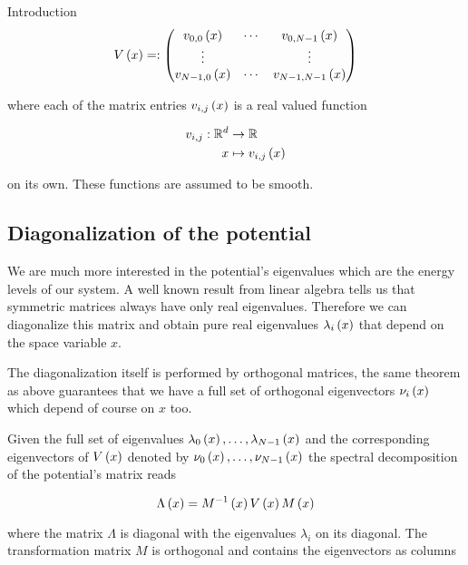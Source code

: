 \begin{chapter}{Introduction}
\begin{equation} \label{eq:general_potential_matrix}
  V\left( x \right) =:
  \begin{pmatrix}
    v_{0,0}\left( x \right) & \cdots & v_{0,N-1}\left( x \right) \\
    \vdots         &        & \vdots \\
    v_{N-1,0}\left( x \right) & \cdots & v_{N-1,N-1}\left( x \right)
  \end{pmatrix}
\end{equation}

where each of the matrix entries $v_{i,j}\left( x \right)$ is a real valued function

\begin{align*} \label{eq:matrix_potential_function_entry}
  v_{i,j} : \mathbb{R}^d & \rightarrow \mathbb{R} \\
                       x & \mapsto v_{i,j}\left( x \right)
\end{align*}

on its own. These functions are assumed to be smooth.

\subsection{Diagonalization of the potential}
\label{sec:diagonalize_potential}

We are much more interested in the potential's eigenvalues which are the energy
levels of our system. A well known result from linear algebra tells us that
symmetric matrices always have only real eigenvalues. Therefore we can diagonalize
this matrix and obtain pure real eigenvalues $\lambda_i\left( x \right)$ that depend on the
space variable $x$.

The diagonalization itself is performed by orthogonal matrices, the same theorem
as above guarantees that we have a full set of orthogonal eigenvectors $\nu_i\left( x \right)$
which depend of course on $x$ too.

Given the full set of eigenvalues $\lambda_0\left( x \right), \ldots, \lambda_{N-1}\left( x \right)$
and the corresponding eigenvectors of $V\left( x \right)$ denoted by $\nu_0\left( x \right), \ldots, \nu_{N-1}\left( x \right)$
the spectral decomposition of the potential's matrix reads

\begin{equation} \label{eq:general_spectral_transformation}
  \Lambda\left( x \right) = M^{-1}\left( x \right) V\left( x \right) M\left( x \right)
\end{equation}

where the matrix $\Lambda$ is diagonal with the eigenvalues $\lambda_i$ on its
diagonal. The transformation matrix $M$ is orthogonal and contains the
eigenvectors as columns


\end{chapter}
